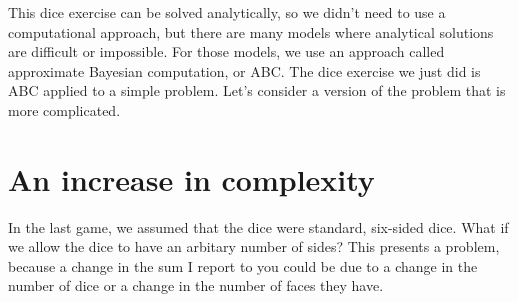 \documentclass[a4paper,10pt]{article}
\begin{document}
This dice exercise can be solved analytically, so we didn't need to use a computational approach, but there are many models where analytical solutions are difficult or impossible.  For those models, we use an approach called approximate Bayesian computation, or ABC.  The dice exercise we just did is ABC applied to a simple problem.  Let's consider a version of the problem that is more complicated.

\section{An increase in complexity}
In the last game, we assumed that the dice were standard, six-sided dice.  What if we allow the dice to have an arbitary number of sides?  This presents a problem, because a change in the sum I report to you could be due to a change in the number of dice or a change in the number of faces they have.
\end{document}
